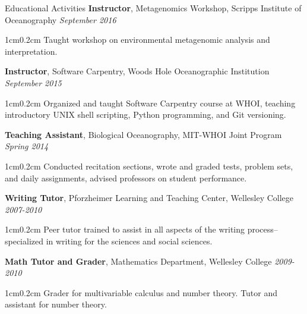 \documentclass{resume}
\newenvironment{tabbed}{\vspace{-20pt}\begin{adjustwidth}{1cm}{0.2cm}}{\end{adjustwidth}}
\begin{document}
\begin{rSection}{Educational Activities}
    {\textbf{Instructor}, Metagenomics Workshop, Scripps Institute of Oceanography} \hfill {\em September 2016} \\
    \begin{tabbed}
         {Taught workshop on environmental metagenomic analysis and interpretation.}  
    \end{tabbed}
  {\textbf{Instructor}, Software Carpentry, Woods Hole Oceanographic Institution} \hfill {\em September 2015} \\
    \begin{tabbed}
         {Organized and taught Software Carpentry course at WHOI, teaching introductory UNIX shell scripting, Python programming, and Git versioning.}  
    \end{tabbed}

  {\textbf{Teaching Assistant}, Biological Oceanography, MIT-WHOI Joint Program} \hfill {\em Spring 2014} \\
    \begin{tabbed}
         {Conducted recitation sections, wrote and graded tests, problem sets, and daily assignments, advised professors on student performance.}  
    \end{tabbed}
    
  {\textbf{Writing Tutor}, Pforzheimer Learning and Teaching Center, Wellesley College} \hfill {\em 2007-2010} \\
    \begin{tabbed}
         {Peer tutor trained to assist in all aspects of the writing process-- specialized in writing for the sciences and social sciences.}  
    \end{tabbed}
 {\textbf{Math Tutor and Grader}, Mathematics Department, Wellesley College} \hfill {\em 2009-2010} \\
    \begin{tabbed}
         {Grader for multivariable calculus and number theory. Tutor and assistant for number theory.}  
    \end{tabbed}
\end{rSection}
\end{document}
